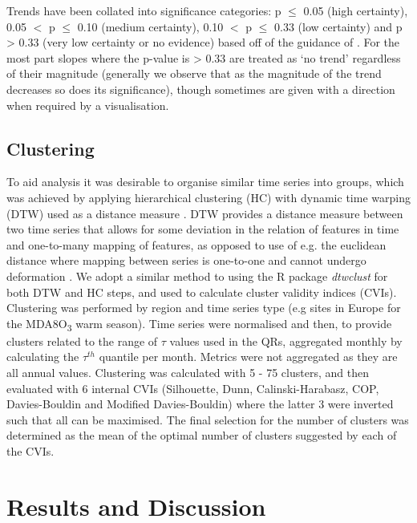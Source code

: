 \documentclass[journal abbreviation, manuscript]{copernicus}
\begin{document}
Trends have been collated into significance categories: p $\le$ 0.05 (high certainty), 0.05 $<$ p $\le$ 0.10 (medium certainty), 0.10 $<$ p $\le$ 0.33 (low certainty) and p > 0.33 (very low certainty or no evidence) based off of the guidance of \cite{chang2023guidancenotebeststatistical}. For the most part slopes where the p-value is > 0.33 are treated as ‘no trend’ regardless of their magnitude (generally we observe that as the magnitude of the trend decreases so does its significance), though sometimes are given with a direction when required by a visualisation.

\subsection{Clustering} \label{sect:method_clustering}
To aid analysis it was desirable to organise similar time series into groups, which was achieved by applying hierarchical clustering (HC) with dynamic time warping (DTW) used as a distance measure \citep{AGHABOZORGI201516}. DTW provides a distance measure between two time series that allows for some deviation in the relation of features in time and one-to-many mapping of features, as opposed to use of e.g. the euclidean distance where mapping between series is one-to-one and cannot undergo deformation \citep{Berndt_dtw, Abdullah_Keogh_dtw}. We adopt a similar method to \cite{REED2025110686} using the R package \emph{dtwclust} \citep{dtwclust} for both DTW and HC steps, and used to calculate cluster validity indices (CVIs). Clustering was performed by region and time series type (e.g sites in Europe for the MDA8O\textsubscript{3} warm season). Time series were normalised and then, to provide clusters related to the range of $\tau$ values used in the QRs, aggregated monthly by calculating the $\tau^{th}$ quantile per month. Metrics were not aggregated as they are all annual values. Clustering was calculated with 5 - 75 clusters, and then evaluated with 6 internal CVIs (Silhouette, Dunn, Calinski-Harabasz, COP, Davies-Bouldin and Modified Davies-Bouldin) where the latter 3 were inverted such that all can be maximised. The final selection for the number of clusters was determined as the mean of the optimal number of clusters suggested by each of the CVIs. 

\clearpage
\section{Results and Discussion}
\end{document}
